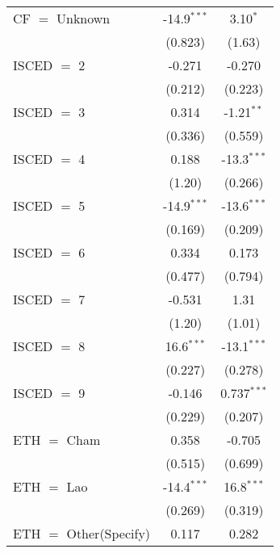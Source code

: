 \begin{table}[htbp!]
\begin{adjustbox}{width = 1\textwidth, max height = 0.95\textheight, center}
\begin{threeparttable}[b]
\begin{tabular}{lcc}
            CF $=$ Unknown                & -14.9$^{***}$  & 3.10$^{*}$\\   
                                          & (0.823)        & (1.63)\\   
            ISCED $=$ 2                   & -0.271         & -0.270\\   
                                          & (0.212)        & (0.223)\\   
            ISCED $=$ 3                   & 0.314          & -1.21$^{**}$\\   
                                          & (0.336)        & (0.559)\\   
            ISCED $=$ 4                   & 0.188          & -13.3$^{***}$\\   
                                          & (1.20)         & (0.266)\\   
            ISCED $=$ 5                   & -14.9$^{***}$  & -13.6$^{***}$\\   
                                          & (0.169)        & (0.209)\\   
            ISCED $=$ 6                   & 0.334          & 0.173\\   
                                          & (0.477)        & (0.794)\\   
            ISCED $=$ 7                   & -0.531         & 1.31\\   
                                          & (1.20)         & (1.01)\\   
            ISCED $=$ 8                   & 16.6$^{***}$   & -13.1$^{***}$\\   
                                          & (0.227)        & (0.278)\\   
            ISCED $=$ 9                   & -0.146         & 0.737$^{***}$\\   
                                          & (0.229)        & (0.207)\\   
            ETH $=$ Cham                  & 0.358          & -0.705\\   
                                          & (0.515)        & (0.699)\\   
            ETH $=$ Lao                   & -14.4$^{***}$  & 16.8$^{***}$\\   
                                          & (0.269)        & (0.319)\\   
            ETH $=$ Other(Specify)        & 0.117          & 0.282\\   

\end{tabular}
\end{threeparttable}
\end{adjustbox}
\end{table}
